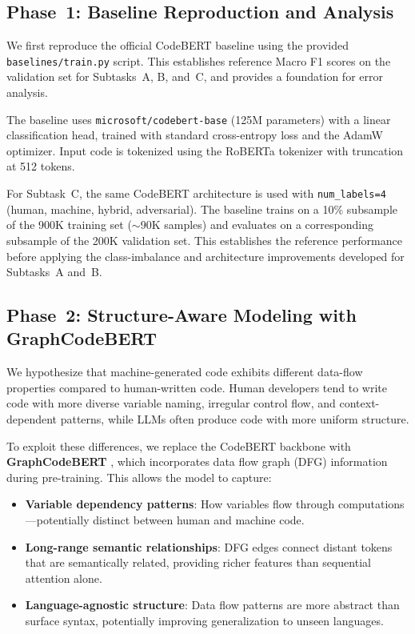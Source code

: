 \documentclass[11pt]{article}
\begin{document}
\subsection{Phase~1: Baseline Reproduction and Analysis}

We first reproduce the official CodeBERT baseline \cite{feng-etal-2020-codebert} using the provided \texttt{baselines/train.py} script. This establishes reference Macro F1 scores on the validation set for Subtasks~A, B, and~C, and provides a foundation for error analysis.

The baseline uses \texttt{microsoft/codebert-base} (125M parameters) with a linear classification head, trained with standard cross-entropy loss and the AdamW optimizer. Input code is tokenized using the RoBERTa tokenizer with truncation at 512 tokens.

For Subtask~C, the same CodeBERT architecture is used with \texttt{num\_labels=4} (human, machine, hybrid, adversarial). The baseline trains on a 10\% subsample of the 900K training set ($\sim$90K samples) and evaluates on a corresponding subsample of the 200K validation set. This establishes the reference performance before applying the class-imbalance and architecture improvements developed for Subtasks~A and~B.

\subsection{Phase~2: Structure-Aware Modeling with GraphCodeBERT}

We hypothesize that machine-generated code exhibits different data-flow properties compared to human-written code. Human developers tend to write code with more diverse variable naming, irregular control flow, and context-dependent patterns, while LLMs often produce code with more uniform structure.

To exploit these differences, we replace the CodeBERT backbone with \textbf{GraphCodeBERT} \cite{guo2021graphcodebert}, which incorporates data flow graph (DFG) information during pre-training. This allows the model to capture:
\begin{itemize}
    \item \textbf{Variable dependency patterns}: How variables flow through computations---potentially distinct between human and machine code.
    \item \textbf{Long-range semantic relationships}: DFG edges connect distant tokens that are semantically related, providing richer features than sequential attention alone.
    \item \textbf{Language-agnostic structure}: Data flow patterns are more abstract than surface syntax, potentially improving generalization to unseen languages.
\end{itemize}
\end{document}
